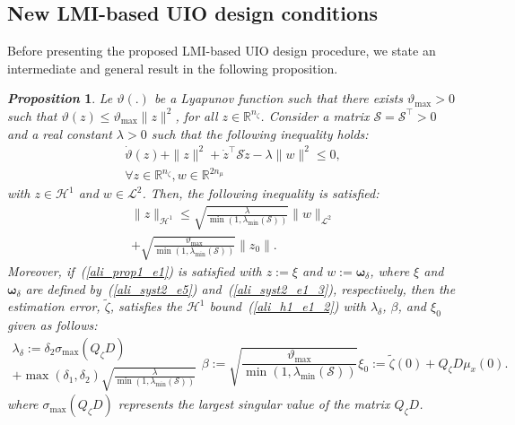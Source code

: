 \documentclass{ifacconf}
\def\eqref#1{(\ref{#1})}
\newtheorem{proposition}{\it \textbf{Proposition}}%
\begin{document}
\subsection{New LMI-based UIO design conditions}
\vspace*{-0.2cm}
%
Before presenting the proposed LMI-based UIO design procedure, we state an intermediate and general result in the following proposition.
%
\begin{proposition}\label{ali_prop1}
Le $\vartheta(.)$ be a Lyapunov function such that there exists $\vartheta_{\max} >0$ such that $\vartheta(z) \leq \vartheta_{\max}\| z \|^{2}$, for all $z \in \mathbb{R}^{n_\zeta}$. Consider a matrix $\mathcal{S} = \mathcal{S}^{\top} > 0$ and a real constant $\lambda >0$ such that the following inequality holds:
\begin{multline}\label{ali_prop1_e1}
\dot{\vartheta}(z) + \| z \|^{2} + \dot{z}^{\top} \mathcal{S} \dot{z} - \lambda \| w \|^{2} \leq 0,\\ 
\forall z \in \mathbb{R}^{n_\zeta}, w \in \mathbb{R}^{2n_{\mu}}
\end{multline}
%
with $z \in \mathcal{H}^{1}$ and $w \in \mathcal{L}^{2}$. Then, the following inequality is satisfied:
\begin{multline}\label{ali_prop1_e2}
\| z \|_{\mathcal{H}^{1}} \leq \sqrt{\frac{\lambda}{\min\left(1,\lambda_{\min}(\mathcal{S})\right)}} \| w \|_{\mathcal{L}^{2}}  \\
+\sqrt{\frac{\vartheta_{\max}}{\min\left(1,\lambda_{\min}(\mathcal{S})\right)}} \| z_0 \|.
\end{multline}
Moreover, if~\eqref{ali_prop1_e1} is satisfied with $z := \xi$ and $w := \bm{\omega}_{\delta}$, where $\xi$ and $\bm{\omega}_{\delta}$ are defined by~\eqref{ali_syst2_e5} and~\eqref{ali_syst2_e1_3}, respectively, then the estimation error, $\tilde{\zeta}$, satisfies the $\mathcal{H}^{1}$ bound~\eqref{ali_h1_e1_2} with $\lambda_{\delta}$, $\beta$, and $\xi_0$ given as follows:
\begin{subequations}
\begin{multline}\label{ali_prop1_e3}
\lambda_{\delta} := \delta_{2} \sigma_{\max}\left(Q_{\zeta} D\right) \\
+ \max\left(\delta_{1}, \delta_{2} \right) \sqrt{\frac{\lambda}{\min\left(1,\lambda_{\min}(\mathcal{S})\right)}}
\end{multline}
\begin{equation}\label{ali_prop1_e4}
\beta := \sqrt{\frac{\vartheta_{\max}}{\min\left(1,\lambda_{\min}(\mathcal{S})\right)}}
\end{equation}
\begin{equation}\label{ali_prop1_e5}
\xi_0 := \tilde{\zeta}(0) + Q_{\zeta} D \mu_{x}(0).
\end{equation}
\end{subequations}
where $\sigma_{\max}\left(Q_{\zeta} D\right)$ represents the largest singular value of the matrix $Q_{\zeta} D$.
\end{proposition}
\end{document}
